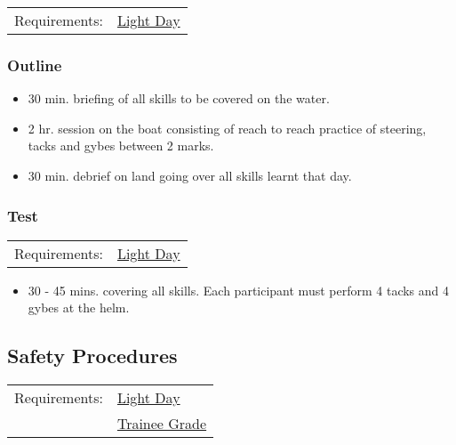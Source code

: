 \documentclass[12pt]{scrartcl}
\begin{document}
\label{tab:basic sailing 1:requirements}
\begin{tabular}{ll}
	Requirements: & \hyperlink{condition:light day}{Light Day} \\
\end{tabular}

\subsubsection{Outline} \label{subsubsec:basic sailing 1:outline}

\begin{itemize}
	\item 30 min. briefing of all skills to be covered on the water.
	\item 2 hr. session on the boat consisting of reach to reach practice of steering, tacks and gybes between 2 marks.
	\item 30 min. debrief on land going over all skills learnt that day.
\end{itemize}

\subsubsection{Test} \label{subsubsec:basic sailing 1:test}

\label{tab:basic sailing:test:requirements}
\begin{tabular}{ll}
	Requirements: & \hyperlink{condition:light day}{Light Day} \\
\end{tabular}

\begin{itemize}
	\item 30 - 45 mins. covering all skills. Each participant must perform 4 tacks and 4 gybes at the helm.
\end{itemize}

\subsection{Safety Procedures} \label{subsec:safety procedures}

\label{tab:safety procedures:requirements}
\begin{tabular}{ll}
	Requirements: & \hyperlink{condition:light day}{Light Day} \\
	& \hyperlink{grade:trainee}{Trainee Grade} \\
\end{tabular}
\end{document}

